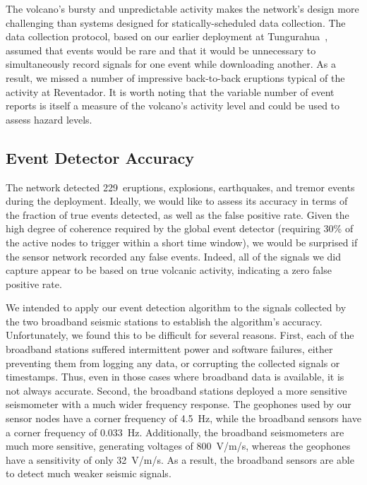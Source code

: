 The volcano's bursty and unpredictable activity makes the network's design
more challenging than systems designed for statically-scheduled data
collection. The data collection protocol, based on our earlier deployment at
Tungurahua~\cite{volcano-ewsn05}, assumed that events would be rare and that
it would be unnecessary to simultaneously record signals for one event while
downloading another. As a result, we missed a number of impressive
back-to-back eruptions typical of the activity at Reventador. It is worth
noting that the variable number of event reports is itself a measure of the
volcano's activity level and could be used to assess hazard levels. 

\subsection{Event Detector Accuracy}
\label{sec-eventdetectaccuracy}

The network detected 229~eruptions, explosions, earthquakes, and tremor
events during the deployment. Ideally, we would like to assess its accuracy
in terms of the fraction of true events detected, as well as the false
positive rate. Given the high degree of coherence required by the global
event detector (requiring 30\% of the active nodes to trigger within a short
time window), we would be surprised if the sensor network recorded any false
events. Indeed, all of the signals we did capture appear to be based on true
volcanic activity, indicating a zero false positive rate.

We intended to apply our event detection algorithm to the signals collected
by the two broadband seismic stations to establish the algorithm's accuracy.
Unfortunately, we found this to be difficult for several reasons. First, each
of the broadband stations suffered intermittent power and software failures,
either preventing them from logging any data, or corrupting the collected
signals or timestamps. Thus, even in those cases where broadband data is
available, it is not always accurate. Second, the broadband stations deployed
a more sensitive seismometer with a much wider frequency response. The
geophones used by our sensor nodes have a corner frequency of 4.5~Hz, while
the broadband sensors have a corner frequency of 0.033~Hz. Additionally, the
broadband seismometers are much more sensitive, generating voltages of
800~V/m/s, whereas the geophones have a sensitivity of only 32~V/m/s. As a
result, the broadband sensors are able to detect much weaker seismic signals.

